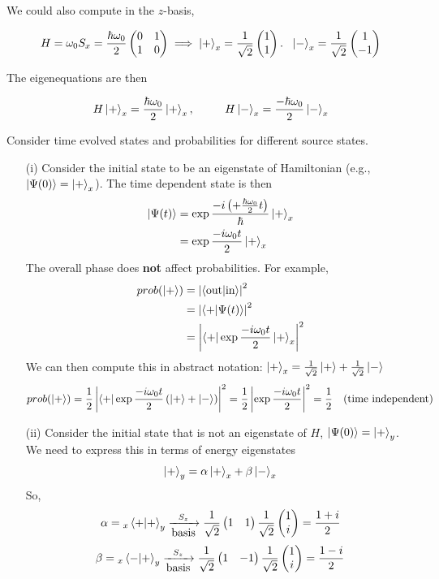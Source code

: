 \documentclass[english, 11pt]{article}
\begin{document}
    We could also compute in the $z$-basis,

    \[ H = \omega_0S_x = \frac{\hbar\omega_0}{2}\left(\begin{matrix}0&1\\1&0\end{matrix}\right) \implies \left|+\right\rangle_x = \frac{1}{\sqrt{2}}\left(\begin{matrix}1\\1\end{matrix}\right). \ \ \left|-\right\rangle_x = \frac{1}{\sqrt{2}}\left(\begin{matrix}1\\-1\end{matrix}\right) \]

    The eigenequations are then

    \[ H\kp_x = \f{\hbar\omega_0}{2} \kp_x , \ \ \ \ \ \ \ \ H\km_x = \f{-\hbar\omega_0}{2} \km_x \]

    Consider time evolved states and probabilities for different source states.

    \begin{itemize}
      \item[(i)] Consider the initial state to be an eigenstate of Hamiltonian (e.g., $\left|\Psi(0)\right\rangle = \left|+\right\rangle_x$). The time dependent state is then
      \begin{align*}
        \left|\Psi(t)\right\rangle & = \exp{\frac{-i \left( +\frac{\hbar\omega_0}{2}t \right)}{\hbar}}\left|+\right\rangle_x \\
                      & = \exp{\frac{-i\omega_0t}{2}}\left|+\right\rangle_x
      \end{align*}
      The overall phase does \textbf{not} affect probabilities. For example,
      \begin{align*}
        prob(\kp) & = \left| \braket{\mbox{out}}{\mbox{in}} \right|^2  \\
                  & = \pr{\braket{+}{\Psi(t)}} \\
                  & = \pr{\bra{+}\exp{\f{-i\omega_0t}{2}}\kp_x}
      \end{align*}
      We can then compute this in abstract notation: $\left|+\right\rangle_x = \frac{1}{\sqrt{2}}\left|+\right\rangle +\frac{1}{\sqrt{2}}\left|-\right\rangle $
      \[ prob(\left|+\right\rangle) = \frac{1}{2}\left|\left\langle+\right|\exp{\frac{-i\omega_0t}{2}}\left( \left|+\right\rangle + \left|-\right\rangle \right)\right|^2 = \frac{1}{2} \left|\exp{\frac{-i\omega_0t}{2}}\right|^2 = \frac{1}{2} \ \ \ \mbox{(time independent)} \]

      \item[(ii)] Consider the initial state that is not an eigenstate of $H$, $\left|\Psi(0)\right\rangle = \left|+\right\rangle_y$. We need to express this in terms of energy eigenstates
      \[ \left|+\right\rangle_y = \alpha\left|+\right\rangle_x + \beta\left|-\right\rangle_x \]
      So,
      \[ \alpha = {}_x\braket{+}{+}_y \xrightarrow[\mbox{basis}]{S_z} \f{1}{\sqrt{2}}\mtx{1 & 1}\f{1}{\sqrt{2}}\mtx{1 \\ i} = \f{1+i}{2}  \]
      \[ \beta = {}_x\braket{-}{+}_y \xrightarrow[\mbox{basis}]{S_z} \f{1}{\sqrt{2}}\mtx{1 & -1}\f{1}{\sqrt{2}}\mtx{1 \\ i} = \f{1-i}{2}  \]


\end{itemize}
\end{document}

